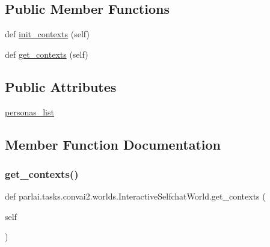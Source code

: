 \subsection*{Public Member Functions}
\begin{DoxyCompactItemize}
\item 
def \hyperlink{classparlai_1_1tasks_1_1convai2_1_1worlds_1_1InteractiveSelfchatWorld_af7524303845371d515ac5ee27a650ce8}{init\+\_\+contexts} (self)
\item 
def \hyperlink{classparlai_1_1tasks_1_1convai2_1_1worlds_1_1InteractiveSelfchatWorld_a3bf4578410c84b762c08cd9e1a8b4549}{get\+\_\+contexts} (self)
\end{DoxyCompactItemize}
\subsection*{Public Attributes}
\begin{DoxyCompactItemize}
\item 
\hyperlink{classparlai_1_1tasks_1_1convai2_1_1worlds_1_1InteractiveSelfchatWorld_aa750cd45fa90b0d961c23e8d25ac5b4a}{personas\+\_\+list}
\end{DoxyCompactItemize}


\subsection{Member Function Documentation}
\mbox{\label{classparlai_1_1tasks_1_1convai2_1_1worlds_1_1InteractiveSelfchatWorld_a3bf4578410c84b762c08cd9e1a8b4549}} 
\subsubsection{\texorpdfstring{get\+\_\+contexts()}{get\_contexts()}}
{\footnotesize\ttfamily def parlai.\+tasks.\+convai2.\+worlds.\+Interactive\+Selfchat\+World.\+get\+\_\+contexts (\begin{DoxyParamCaption}\item[{}]{self }\end{DoxyParamCaption})}

